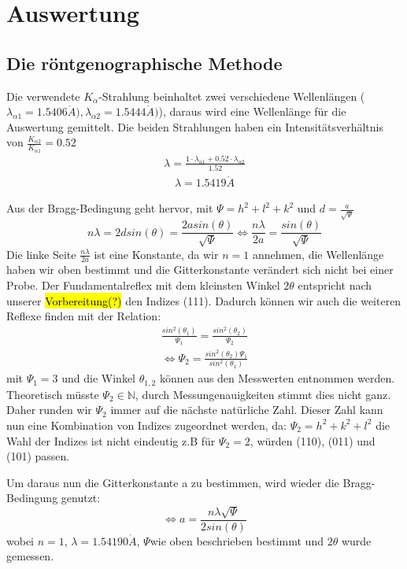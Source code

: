 \section{Auswertung}
    \subsection{Die röntgenographische Methode}
        Die verwendete $K_{\alpha}$-Strahlung beinhaltet zwei verschiedene Wellenlängen ($\lambda_{\alpha 1} = 1.5406 \mathring{A}), \lambda_{\alpha 2} = 1.5444 \mathring{A})$),
         daraus wird eine Wellenlänge
        für die Auswertung gemittelt. Die beiden Strahlungen haben ein Intensitätsverhältnis von $\frac{K_{\alpha 2}}{K_{\alpha 1}} = 0.52$
        \begin{align}
            \lambda = \frac{1 \cdot \lambda_{\alpha 1} + 0.52 \cdot \lambda_{\alpha 2}}{1.52}
        \end{align}
        \begin{align*}
            \lambda = 1.5419 \mathring{A}
        \end{align*}

        Aus der Bragg-Bedingung geht hervor, mit $\Psi =  h^2 + l^2 + k^2$ und $d = \frac{a}{\sqrt{\Psi}}$
        \begin{equation}
            n \lambda = 2dsin(\theta) = \frac{2asin(\theta)}{\sqrt{\Psi}} \Leftrightarrow \frac{n \lambda}{2a} = \frac{sin(\theta)}{\sqrt{\Psi}}
        \end{equation}
        Die linke Seite $\frac{n \lambda}{2a}$ ist eine Konstante, da wir $n=1$ annehmen, die Wellenlänge haben wir oben 
        bestimmt und die Gitterkonstante verändert sich nicht bei einer Probe. Der Fundamentalreflex mit dem kleinsten Winkel
        $2\theta$ entspricht nach unserer \hl{Vorbereitung(?)} den Indizes (111). Dadurch können wir auch die 
        weiteren Reflexe finden mit der Relation:
        \begin{align}
            \frac{sin^2(\theta_1)}{\Psi_1} = \frac{sin^2(\theta_2)}{\Psi_2} \\
            \Leftrightarrow \Psi_2 = \frac{sin^2(\theta_2)\Psi_1}{sin^2(\theta_1)}
        \end{align}
        mit $\Psi_1 = 3$ und die Winkel $\theta_{1,2}$ können aus den Messwerten entnommen werden. Theoretisch
        müsste $\Psi_2 \in \mathbb{N}$, durch Messungenauigkeiten stimmt dies nicht ganz. Daher runden wir $\Psi_2$ immer auf die 
        nächste natürliche Zahl. Dieser Zahl kann nun eine Kombination von Indizes zugeordnet werden, da:
        $\Psi_2 = h^2+k^2+l^2$ die Wahl der Indizes ist nicht eindeutig z.B für $\Psi_2 = 2$, würden (110), (011) und (101) passen.
        
        Um daraus nun die Gitterkonstante a zu bestimmen, wird wieder die Bragg-Bedingung genutzt:
        \begin{equation}
            \Leftrightarrow a = \frac{n \lambda \sqrt{\Psi}}{2 sin(\theta)}
        \end{equation}
        wobei $n=1$, $\lambda = 1.54190 \mathring{A}$, $\Psi$wie oben beschrieben bestimmt und $2 \theta$ wurde gemessen.
